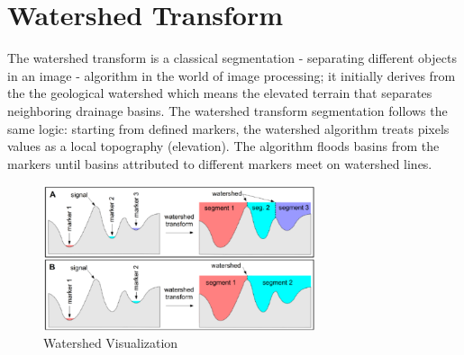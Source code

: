 \documentclass{article}
\begin{document}
\section{Watershed Transform}
\vspace{2mm}
\begin{flushleft}
The watershed transform is a classical segmentation - separating different objects in an image - algorithm in the world of image processing; it initially derives from the the geological watershed which means the elevated terrain that separates neighboring drainage basins. The watershed transform segmentation follows the same logic: starting from defined markers, the watershed algorithm treats pixels values as a local topography (elevation). The algorithm floods basins from the markers until basins attributed to different markers meet on watershed lines. \newline
\vspace{2mm}
\end{flushleft}
\begin{figure}[ht]
    \centering
    \includegraphics[width=8cm]{watershed.png}
    \caption{Watershed Visualization}
    \label{fig:watershed_visualization}
\end{figure}
\end{document}
